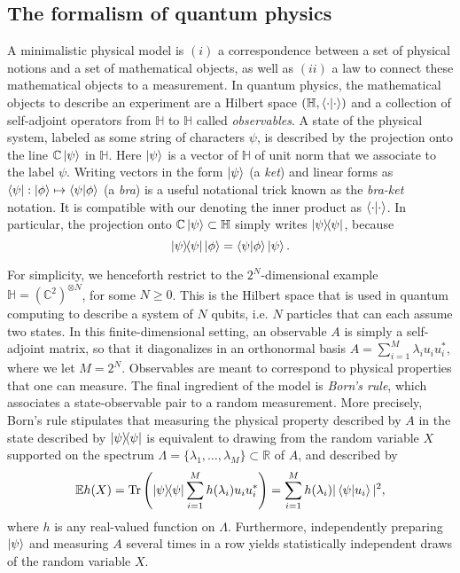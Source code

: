 \subsection{The formalism of quantum physics}
A minimalistic physical model is $(i)$ a correspondence between a set of physical notions and a set of mathematical objects, as well as $(ii)$ a law to connect these mathematical objects to a measurement.
In quantum physics, the mathematical objects to describe an experiment are a Hilbert space $(\mathbb{H},\braket{\cdot}{\cdot})$ and a collection of self-adjoint operators from $\mathbb{H}$ to $\mathbb{H}$ called \emph{observables}.
A state of the physical system, labeled as some string of characters $\psi$, is described by the projection onto the line $\mathbb{C}\ket{\psi}$ in $\mathbb{H}$. 
Here $\ket{\psi}$ is a vector of $\mathbb{H}$ of unit norm that we associate to the label $\psi$. 
Writing vectors in the form $\ket{\psi}$ (a \emph{ket}) and linear forms as $\bra{\psi}:\ket{\phi} \mapsto \braket{\psi}{\phi}$ (a \emph{bra}) is a useful notational trick known as the \emph{bra-ket} notation.
It is compatible with our denoting the inner product as $\braket{\cdot}{\cdot}$.
In particular, the projection onto $\mathbb{C}\ket{\psi}\subset\mathbb{H}$ simply writes $\ketbra{\psi}$, because
$$
\ketbra{\psi} \ket{\phi} = \braket{\psi}{\phi} \ket{\psi}.
$$

For simplicity, we henceforth restrict to the $2^N$-dimensional example $\mathbb{H} = (\mathbb{C}^2)^{\otimes N}$, for some $N\geq 0$. 
This is the Hilbert space that is used in quantum computing to describe a system of $N$ qubits, i.e. $N$ particles that can each assume two states.
In this finite-dimensional setting, an observable $A$ is simply a self-adjoint matrix, so that it diagonalizes in an orthonormal basis $A = \sum_{i=1}^{M} \lambda_i u_i u_i^*$, where we let $M=2^N$.
Observables are meant to correspond to physical properties that one can measure.
The final ingredient of the model is \emph{Born's rule}, which associates a state-observable pair to a random measurement.
More precisely, Born's rule stipulates that measuring the physical property described by $A$ in the state described by $\ketbra{\psi}$ is equivalent to drawing from the random variable $X$ supported on the spectrum $\Lambda = \{\lambda_1, \dots, \lambda_{M}\} \subset \mathbb{R}$ of $A$, and described by 
\begin{equation}
    \label{e:born}
    \mathbb{E} h(X) = \mathrm{Tr}\left(\ketbra{\psi} \sum_{i=1}^M h(\lambda_i)u_i u_i^*\right ) = \sum_{i=1}^M h(\lambda_i) \vert\braket{\psi}{u_i}\vert^2,
\end{equation}
where $h$ is any real-valued function on $\Lambda$.
Furthermore, independently preparing $\ket{\psi}$ and measuring $A$ several times in a row yields statistically independent draws of the random variable $X$.

